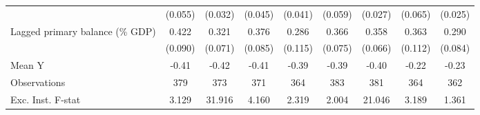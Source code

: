 {\begin{tabular}{l*{8}{c}}
                    &     (0.055)         &     (0.032)         &     (0.045)         &     (0.041)         &     (0.059)         &     (0.027)         &     (0.065)         &     (0.025)         \\
\addlinespace
Lagged primary balance (\% GDP)&       0.422\sym{***}&       0.321\sym{***}&       0.376\sym{***}&       0.286\sym{**} &       0.366\sym{***}&       0.358\sym{***}&       0.363\sym{***}&       0.290\sym{***}\\
                    &     (0.090)         &     (0.071)         &     (0.085)         &     (0.115)         &     (0.075)         &     (0.066)         &     (0.112)         &     (0.084)         \\
\midrule
Mean Y              &       -0.41         &       -0.42         &       -0.41         &       -0.39         &       -0.39         &       -0.40         &       -0.22         &       -0.23         \\
Observations        &         379         &         373         &         371         &         364         &         383         &         381         &         364         &         362         \\
Exc. Inst. F-stat   &       3.129         &      31.916         &       4.160         &       2.319         &       2.004         &      21.046         &       3.189         &       1.361         \\
\bottomrule
\end{tabular}
}
